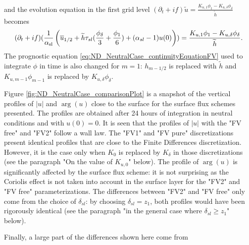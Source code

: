 and the evolution equation in the first grid level
$ (\partial_t+if) \widetilde{u}
= \frac{K_{u, 1}\phi_1 - K_{u,\delta} \phi_{\delta}}{\widetilde{h}}$
becomes
\begin{equation}
	\label{eq:ND_NeutralCase_semiDiscreteEkmanEqFVfree}
	(\partial_t+if) (\frac{1}{\alpha_{\rm sl}}
	\left(\overline{u}_{1/2} + \widetilde{h}\tau_{sl}
	(\frac{\phi_{\delta}}{3} + \frac{\phi_1}{6})
	+ (\alpha_{sl} - 1) u(0)
	\right))
	= \frac{K_{u, 1}\phi_1 - K_{u,\delta} \phi_{\delta}}{\widetilde{h}}.
\end{equation}
The prognostic equation \eqref{eq:ND_NeutralCase_continuityEquationFV}
used to integrate $\phi$ in time
is also changed for $m=1$: $h_{m-1/2}$ is replaced
with $\widetilde{h}$ and $K_{u, m-1}\phi_{m-1}$ is replaced by
$K_{u,\delta}\phi_{\delta}$.
%
\par
Figure \ref{fig:ND_NeutralCase_comparisonPlot} is a snapshot of
the vertical profiles of $|u|$ and $\arg(u)$ close to the surface
for the surface flux schemes presented.
The profiles are obtained after 24 hours of integration in neutral
conditions and with $u(0) = 0$.
It is seen that the profiles of $|u|$ with the "FV free" and "FV2"
follow a wall law. The "FV1" and "FV pure" discretizations
present identical profiles that are close to the Finite Differences
discretization. However, it is the case only when $K_0$ is
replaced by $K_{\delta}$ in those discretizations
(see the paragraph "On the value of $K_{u,0}$" below).
The profile of $\arg(u)$ is significantly affected by the surface
flux scheme: it is not surprising as the Coriolis effect is
not taken into account in the surface layer for the "FV2" and
"FV free" parameterizations.
The differences between "FV2" and "FV free" only come from the
choice of $\delta_{sl}$:
by choosing $\delta_{sl}=z_1$, both profiles would have been
rigorously identical
(see the paragraph "in the general case where
$\delta_{sl} \geq z_1$" below).
\par
Finally, a large part of the differences shown here come from
